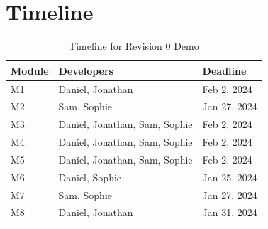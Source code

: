 \documentclass[12pt, titlepage]{article}
\begin{document}
\section{Timeline}
\begin{table}[H]
\centering
\begin{tabular}{lll}
\toprule
\textbf{Module} & \textbf{Developers} & \textbf{Deadline}\\
\midrule
M1 & Daniel, Jonathan & Feb 2, 2024\\
M2 & Sam, Sophie & Jan 27, 2024\\
M3 & Daniel, Jonathan, Sam, Sophie & Feb 2, 2024\\
M4 & Daniel, Jonathan, Sam, Sophie & Feb 2, 2024\\
M5 & Daniel, Jonathan, Sam, Sophie & Feb 2, 2024\\
M6 & Daniel, Sophie & Jan 25, 2024\\
M7 & Sam, Sophie & Jan 27, 2024\\
M8 & Daniel, Jonathan & Jan 31, 2024\\
\bottomrule
\end{tabular}
\caption{Timeline for Revision 0 Demo}
\label{TblT}
\end{table}
\end{document}
